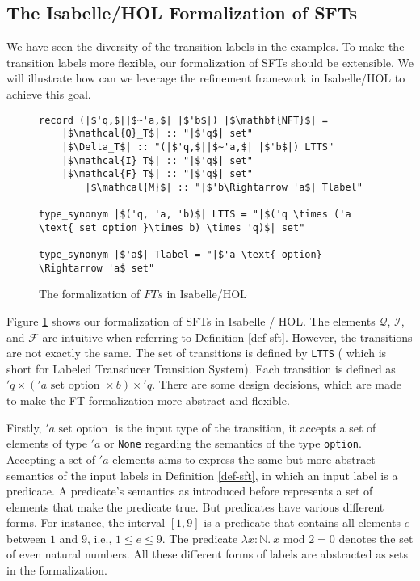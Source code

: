 \documentclass[a4paper,UKenglish,cleveref, autoref, thm-restate]{lipics-v2021}
\begin{document}
\subsection{The Isabelle/HOL Formalization of SFTs}

We have seen the diversity of the transition labels in the examples. To make the transition labels more flexible, our formalization of SFTs should be extensible. We will illustrate how can we leverage the refinement framework in Isabelle/HOL to achieve this goal.

\begin{figure}[hbt!]
	\begin{lstlisting}
record (|$'q,$||$~'a,$| |$'b$|) |$\mathbf{NFT}$| =
	|$\mathcal{Q}_T$| :: "|$'q$| set"
	|$\Delta_T$| :: "(|$'q,$||$~'a,$| |$'b$|) LTTS"
	|$\mathcal{I}_T$| :: "|$'q$| set"
	|$\mathcal{F}_T$| :: "|$'q$| set"
        |$\mathcal{M}$| :: "|$'b\Rightarrow 'a$| Tlabel"
        
type_synonym |$('q, 'a, 'b)$| LTTS = "|$('q \times ('a \text{ set option }\times b) \times 'q)$| set"

type_synonym |$'a$| Tlabel = "|$'a \text{ option} \Rightarrow 'a$ set"
	\end{lstlisting}
\caption{The formalization of $FTs$ in Isabelle/HOL}
\label{fig-def-FT}
\end{figure}

Figure \ref{fig-def-FT} shows our formalization of SFTs in Isabelle / HOL. The elements $\mathcal{Q}$, $\mathcal{I}$, and $\mathcal{F}$ are intuitive when referring to Definition \ref{def-sft}. However, the transitions are not exactly the same. 
%
The set of transitions is defined by \texttt{LTTS} ( which is short for Labeled Transducer Transition System). Each transition is defined as $'q \times ('a \text{ set option }\times b) \times 'q$. There are some design decisions, which are made to make the FT formalization more abstract and flexible.

Firstly, $'a \text{ set option }$ is the input type of the transition, it accepts a set of elements of type $'a$ or \texttt{None} regarding the semantics of the type \texttt{option}. 
Accepting a set of $'a$ elements aims to express the same but more abstract semantics of the input labels in Definition \ref{def-sft}, in which an input label is a predicate. A predicate's semantics as introduced before represents a set of elements that make the predicate true. But predicates have various different forms. For instance, the interval $[1, 9]$ is a predicate that contains all elements $e$ between $1$ and $9$, i.e., $1 \leq e \leq 9$. The predicate $\lambda x : \mathbb{N}.~ x \text{ mod } 2 = 0$ denotes the set of even natural numbers. All these different forms of labels are abstracted as sets in the formalization.
\end{document}
